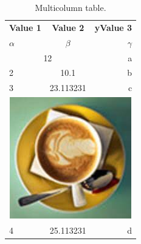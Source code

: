 \documentclass{article}
\begin{document}
  
\begin{table}[h!] 
	\begin{center} 
		\caption{Multicolumn table.} 
		\label{tab:table1} 
		\begin{tabular}{|l|c|r|} 
			\hline 
			\textbf{Value 1} & \textbf{Value 2} & \textbf{yValue 3}\\ 
			$\alpha$ & $\beta$ & $\gamma$ \\ 
			\hline \multicolumn{2}{|c|}{12} & a\\  \hline 2 & 10.1 & b\\ 3 & 23.113231 & c\\ 
			\hline \multicolumn{3}{|c|}{\includegraphics[width=0.15\linewidth]{Picture3}}
			 \\ 
			\hline 
			4 & 25.113231 & d\\
			\hline
		 \end{tabular} 
	\end{center}
 \end{table}
\end{document}
